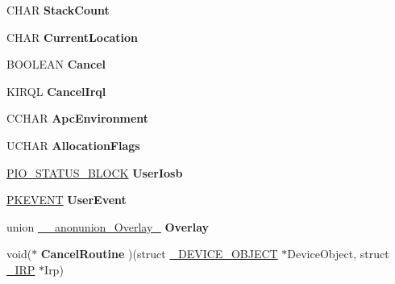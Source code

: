 \begin{DoxyCompactItemize}
\item 
\hypertarget{struct__IRP_a100d943ac636e3255abebb58721a4be6}{}C\+H\+A\+R {\bfseries Stack\+Count}\label{struct__IRP_a100d943ac636e3255abebb58721a4be6}

\item 
\hypertarget{struct__IRP_a7f20478c73e082c60e03ffa7f3e9299d}{}C\+H\+A\+R {\bfseries Current\+Location}\label{struct__IRP_a7f20478c73e082c60e03ffa7f3e9299d}

\item 
\hypertarget{struct__IRP_a53023f037f135d47384a7d6c13dd3f82}{}B\+O\+O\+L\+E\+A\+N {\bfseries Cancel}\label{struct__IRP_a53023f037f135d47384a7d6c13dd3f82}

\item 
\hypertarget{struct__IRP_a28feed9d26446f8a54dcbbabbdcef21f}{}K\+I\+R\+Q\+L {\bfseries Cancel\+Irql}\label{struct__IRP_a28feed9d26446f8a54dcbbabbdcef21f}

\item 
\hypertarget{struct__IRP_ae3587c17a8d6442eae49dd16a3f766da}{}C\+C\+H\+A\+R {\bfseries Apc\+Environment}\label{struct__IRP_ae3587c17a8d6442eae49dd16a3f766da}

\item 
\hypertarget{struct__IRP_abadd353a896fcc166cc01a47d58cb0d2}{}U\+C\+H\+A\+R {\bfseries Allocation\+Flags}\label{struct__IRP_abadd353a896fcc166cc01a47d58cb0d2}

\item 
\hypertarget{struct__IRP_aab6d1f52d397176d2192cdb10a27048f}{}\hyperlink{struct__IO__STATUS__BLOCK}{P\+I\+O\+\_\+\+S\+T\+A\+T\+U\+S\+\_\+\+B\+L\+O\+C\+K} {\bfseries User\+Iosb}\label{struct__IRP_aab6d1f52d397176d2192cdb10a27048f}

\item 
\hypertarget{struct__IRP_a3383b34a1b8c256a0a6489a19ddb966c}{}\hyperlink{struct__KEVENT}{P\+K\+E\+V\+E\+N\+T} {\bfseries User\+Event}\label{struct__IRP_a3383b34a1b8c256a0a6489a19ddb966c}

\item 
\hypertarget{struct__IRP_a95a20096ded397ff8d600ed3799bc758}{}union \hyperlink{union____anonunion__Overlay__45}{\+\_\+\+\_\+anonunion\+\_\+\+Overlay\+\_} {\bfseries Overlay}\label{struct__IRP_a95a20096ded397ff8d600ed3799bc758}

\item 
\hypertarget{struct__IRP_a7e68b0a89a5b48eb7ff04c67269a868c}{}void($\ast$ {\bfseries Cancel\+Routine} )(struct \hyperlink{struct__DEVICE__OBJECT}{\+\_\+\+D\+E\+V\+I\+C\+E\+\_\+\+O\+B\+J\+E\+C\+T} $\ast$Device\+Object, struct \hyperlink{struct__IRP}{\+\_\+\+I\+R\+P} $\ast$Irp)\label{struct__IRP_a7e68b0a89a5b48eb7ff04c67269a868c}


\end{DoxyCompactItemize}
